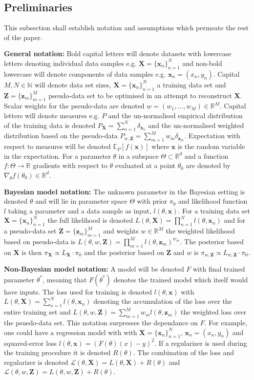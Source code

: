 \documentclass[hyperref]{article}
\theoremstyle{plain}
\theoremstyle{remark}
\newcommand{\bx}{\mathbf{x}}
\newcommand{\bz}{\mathbf{z}}
\newcommand{\bX}{\mathbf{X}}
\newcommand{\bZ}{\mathbf{Z}}
\newcommand{\bbR}{\mathbb{R}}
\newcommand{\bbN}{\mathbb{N}}
\newcommand{\bbE}{\mathbb{E}}
\newcommand{\calL}{\mathcal{L}}
\begin{document}
\subsection{Preliminaries}
This subsection shall establish  notation and assumptions which permeate the rest of the paper. 

\textbf{General notation:} Bold capital letters will denote datasets with lowercase letters denoting individual data samples e.g. $\mathbf{X} = \{\mathbf{x}_{n}\}_{n=1}^{N}$ and non-bold lowercase will denote components of data samples e.g. $\mathbf{x}_{n} = (x_{n},y_{n})$. Capital $M,N\in\bbN$ will denote data set sizes, $\bX = \{\bx_{n}\}_{n=1}^{N}$ a training data set and $\bZ = \{\bz_{m}\}_{m=1}^{M}$ pseudo-data set to be optimised in an attempt to reconstruct $\bX$. Scalar weights for the pseudo-data are denoted $w = (w_{1},\ldots,w_{M})\in\bbR^{M}$. Capital letters will denote measures e.g. $P$ and the un-normalised empirical distribution of the training data is denoted $P_{\bX} = \sum_{n=1}^{N}\delta_{\bx_{n}}$ and the un-normalised weighted distribution based on the pseudo-data $P_{w,\bZ} = \sum_{m=1}^{M}w_{m}\delta_{\bz_{m}}$. Expectation with respect to measures will be denoted $\bbE_{P}[f(\mathbf{x})]$ where $\bx$ is the random variable in the expectation. For a parameter $\theta$ in a subspace $\Theta\subset\bbR^{d}$ and a function $f\colon\Theta\rightarrow\bbR$ gradients with respect to $\theta$ evaluated at a point $\theta_{0}$ are denoted by $\nabla_{\theta}f(\theta_{0})\in\bbR^{d}$. 

\textbf{Bayesian model notation:} The unknown parameter in the Bayesian setting is denoted $\theta$ and will lie in parameter space $\Theta$ with prior $\pi_{0}$ and likelihood function $l$ taking a parameter and a data sample as input, $l(\theta, \bx)$. For a training data set $\bX=\{\bx_{n}\}_{n=1}^{N}$ the full likelihood is denoted $L(\theta,\bX )  = \prod_{n=1}^{N}l(\theta,\bx_{n})$ and for a pseudo-data set $\bZ=\{\bz_{m}\}_{m=1}^{M}$ and weights $w \in\bbR^{M}$ the weighted likelihood based on pseudo-data is $L(\theta,w,\bZ) = \prod_{m=1}^{M}l(\theta,\bz_{m})^{w_{m}}$. The posterior based on $\bX$ is then $\pi_{\bX}\propto L_{\bX}\cdot\pi_{0}$ and the posterior based on $\bZ$ and $w$ is $\pi_{w,\bZ}\propto L_{w,\bZ}\cdot\pi_{0}$. 

\textbf{Non-Bayesian model notation:} A model will be denoted $F$ with final trained parameter $\theta^{*}$, meaning that $F(\theta^{*})$ denotes the trained model which itself would have inputs. The loss used for training is denoted $l(\theta,\bx)$ with $L(\theta, \bX) = \sum_{n=1}^{N}l(\theta,\bx_{n})$ denoting the accumulation of the loss over the entire training set and $L(\theta, w,\bZ) = \sum_{m=1}^{M}w_{m}l(\theta, \bz_{m})$ the weighted loss over the psuedo-data set. This notation surpresses the dependance on $F$. For example, one could have a regression model with with $\bX = \{\bx_{n}\}_{n=1}^{N}$, $\bx_{n} = (x_{n},y_{n})$ and squared-error loss $l(\theta,\bx) = (F(\theta)(x)-y)^{2}$. If a regularizer is used during the training procedure it is denoted $R(\theta)$. The combination of the loss and regularizer is denoted $\calL(\theta,\bX) = L(\theta, \bX) + R(\theta)$ and $\calL(\theta,w,\bZ) = L(\theta,w,\bZ) + R(\theta)$.
\end{document}
